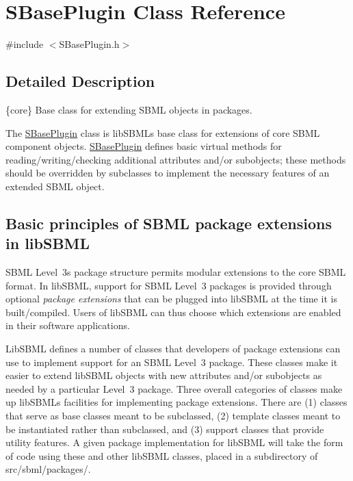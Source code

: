 \hypertarget{class_s_base_plugin}{}\section{S\+Base\+Plugin Class Reference}
\label{class_s_base_plugin}


{\ttfamily \#include $<$S\+Base\+Plugin.\+h$>$}



\subsection{Detailed Description}
\{core\} Base class for extending S\+B\+ML objects in packages.



The \hyperlink{class_s_base_plugin}{S\+Base\+Plugin} class is lib\+S\+B\+ML\textquotesingle{}s base class for extensions of core S\+B\+ML component objects. \hyperlink{class_s_base_plugin}{S\+Base\+Plugin} defines basic virtual methods for reading/writing/checking additional attributes and/or subobjects; these methods should be overridden by subclasses to implement the necessary features of an extended S\+B\+ML object.\hypertarget{classdoc__basics__of__extensions_ext-basics}{}\subsection{Basic principles of S\+B\+M\+L package extensions in lib\+S\+B\+ML}\label{classdoc__basics__of__extensions_ext-basics}
\begin{DoxyParagraph}{}
S\+B\+ML Level~3\textquotesingle{}s package structure permits modular extensions to the core S\+B\+ML format. In lib\+S\+B\+ML, support for S\+B\+ML Level~3 packages is provided through optional {\itshape package extensions} that can be plugged into lib\+S\+B\+ML at the time it is built/compiled. Users of lib\+S\+B\+ML can thus choose which extensions are enabled in their software applications.
\end{DoxyParagraph}
Lib\+S\+B\+ML defines a number of classes that developers of package extensions can use to implement support for an S\+B\+ML Level~3 package. These classes make it easier to extend lib\+S\+B\+ML objects with new attributes and/or subobjects as needed by a particular Level~3 package. Three overall categories of classes make up lib\+S\+B\+ML\textquotesingle{}s facilities for implementing package extensions. There are (1) classes that serve as base classes meant to be subclassed, (2) template classes meant to be instantiated rather than subclassed, and (3) support classes that provide utility features. A given package implementation for lib\+S\+B\+ML will take the form of code using these and other lib\+S\+B\+ML classes, placed in a subdirectory of {\ttfamily src/sbml/packages/}.

